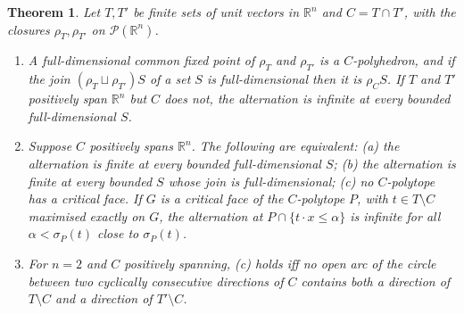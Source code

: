 \documentclass[11pt]{amsart}
\newtheorem{thm}{Theorem}[section]
\theoremstyle{definition}
\newcommand{\cP}{\mathcal P}
\begin{document}
\begin{thm}\label{thm:template}
Let $T,T'$ be finite sets of unit vectors in $\mathbb R^n$ and $C=
T\cap T'$, with the closures $\rho_T,\rho_{T'}$ on $\cP(\mathbb R^n)$.
\begin{enumerate}
\item[(i)] A full-dimensional common fixed point of $\rho_T$ and
$\rho_{T'}$ is a $C$-polyhedron, and if the join $(\rho_T\sqcup\rho_{T'})
S$ of a set $S$ is full-dimensional then it is $\rho_CS$. If $T$ and $T'$
positively span $\mathbb R^n$ but $C$ does not, the alternation is
infinite at every bounded full-dimensional $S$.
\item[(ii)] Suppose $C$ positively spans $\mathbb R^n$. The following are
equivalent: (a) the alternation is finite at every bounded
full-dimensional $S$; (b) the alternation is finite at every bounded $S$
whose join is full-dimensional; (c) no $C$-polytope has a critical face.
If $G$ is a critical face of the $C$-polytope $P$, with $t\in T\setminus
C$ maximised exactly on $G$, the alternation at $P\cap\{t\cdot x\le
\alpha\}$ is infinite for all $\alpha<\sigma_P(t)$ close to
$\sigma_P(t)$.
\item[(iii)] For $n=2$ and $C$ positively spanning, (c) holds iff no open
arc of the circle between two cyclically consecutive directions of $C$
contains both a direction of $T\setminus C$ and a direction of
$T'\setminus C$.
\end{enumerate}
\end{thm}
\end{document}
